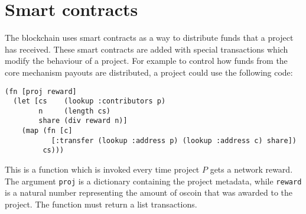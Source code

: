 \section{Smart contracts}

The \oscoin{} blockchain uses smart contracts as a way to distribute funds that
a project has received. These smart contracts are added with special
transactions which modify the behaviour of a project. For example to control how
funds from the core mechanism payouts are distributed, a project could use the
following code:

\begin{lstlisting}
(fn [proj reward]
  (let [cs    (lookup :contributors p)
        n     (length cs)
        share (div reward n)]
    (map (fn [c]
           [:transfer (lookup :address p) (lookup :address c) share])
         cs)))
\end{lstlisting}

This is a function which is invoked every time project $P$ gets a network
reward. The argument \texttt{proj} is a dictionary containing the project
metadata, while \texttt{reward} is a natural number representing the amount of
oscoin that was awarded to the project. The function must return a list
transactions.

